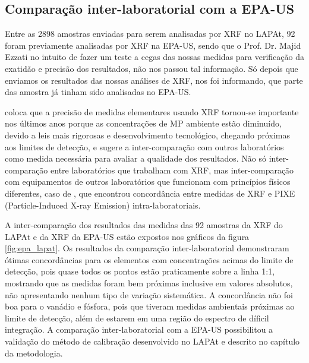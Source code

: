 \subsection{Comparação inter-laboratorial com a EPA-US}

Entre as 2898 amostras enviadas para serem analisadas por XRF no LAPAt, 92 foram 
previamente analisadas por XRF na EPA-US, sendo que o Prof. Dr. Majid Ezzati
no intuito de fazer um teste a cegas das nossas medidas para verificação da 
exatidão e precisão dos resultados, não nos passou tal informação. Só depois que
enviamos os resultados das nossas análises de XRF, 
nos foi informando, que parte das amostra já tinham sido analisadas no EPA-US. 

\citet{kang2014} coloca que a precisão de medidas elementares usando XRF 
tornou-se importante nos últimos anos porque as concentrações de MP ambiente 
estão diminuído, devido a leis mais rigorosas e desenvolvimento tecnológico, 
chegando próximas aos limites de detecção, e sugere a inter-comparação com 
outros laboratórios como medida necessária para avaliar a qualidade dos 
resultados. Não só inter-comparação entre laboratórios que trabalham com XRF, 
mas inter-comparação com equipamentos de outros laboratórios que funcionam com
princípios físicos diferentes, caso de \citet{nejedly1998}, que encontrou 
concordância entre medidas de XRF e PIXE (Particle-Induced X-ray Emission) 
intra-laboratoriais.

A inter-comparação dos resultados das medidas das 92 amostras da XRF do
LAPAt e da XRF da EPA-US estão expostos nos gráficos da figura 
\ref{fig:epa_lapat}. Os resultados da comparação inter-laboratorial demonstraram
ótimas concordâncias para os 
elementos com concentrações acimas do limite de detecção, pois quase todos
os pontos estão praticamente sobre a linha 1:1, mostrando que as
medidas foram bem próximas inclusive em valores absolutos, não apresentando
nenhum tipo de variação sistemática. A concordância não foi boa para o vanádio 
e fósfora, pois que tiveram medidas ambientais próximas ao limite de detecção, 
além de estarem em uma região do espectro de díficil integração. 
A comparação inter-laboratorial com a EPA-US possibilitou a 
validação do método de calibração desenvolvido no LAPAt e descrito no capítulo
da metodologia.

